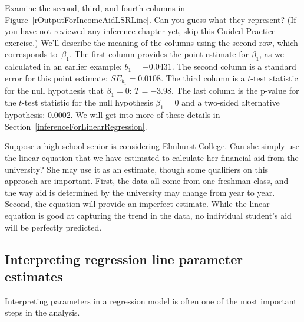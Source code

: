 \D{\newpage}

\begin{examplewrap}
\begin{nexample}{Examine the second, third, and fourth columns
    in Figure~\ref{rOutputForIncomeAidLSRLine}.
    Can you guess what they represent?
    (If you have not reviewed any inference chapter yet,
    skip this Guided Practice exercise.)}
  We'll describe the meaning of the columns using the
  second row, which corresponds to~$\beta_1$.
  The first column provides the point estimate for $\beta_1$,
  as we calculated in an earlier example: $b_1 = -0.0431$.
  The second column is a standard error for this point estimate:
  $SE_{b_1} = 0.0108$.
  The third column is a $t$-test statistic for the null
  hypothesis that $\beta_1 = 0$: $T = -3.98$.
  The last column is the p-value for the $t$-test statistic
  for the null hypothesis $\beta_1 = 0$ and a two-sided
  alternative hypothesis: 0.0002.
  We will get into more of these details in
  Section~\ref{inferenceForLinearRegression}.
\end{nexample}
\end{examplewrap}

\begin{examplewrap}
\begin{nexample}{Suppose a high school senior is considering
    Elmhurst College.
    Can she simply use the linear equation that we have estimated
    to calculate her financial aid from the university?}
  She may use it as an estimate, though some qualifiers on this
  approach are important.
  First, the data all come from one freshman class,
  and the way aid is determined by the university may change
  from year to year.
  Second, the equation will provide an imperfect estimate.
  While the linear equation is good at capturing the trend
  in the data, no individual student's aid will be perfectly
  predicted.
\end{nexample}
\end{examplewrap} 



\subsection{Interpreting regression line parameter estimates}


\noindent%
Interpreting parameters in a regression model is often one
of the most important steps in the analysis.


